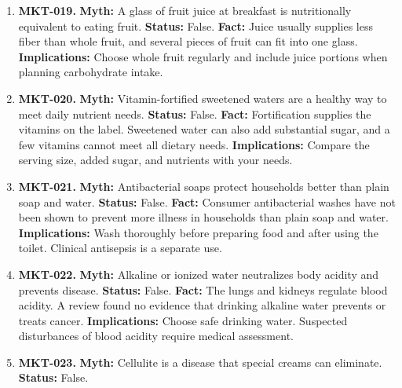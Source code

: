 \documentclass[11pt,oneside]{book}
\begin{document}
\begin{enumerate}[leftmargin=0pt,labelwidth=0pt,labelsep=0pt,itemindent=0pt]
\item[] \textbf{MKT-019.} \textbf{Myth:} A glass of fruit juice at breakfast is nutritionally equivalent to eating fruit.\newline
\textbf{Status:} False.\newline
\textbf{Fact:} Juice usually supplies less fiber than whole fruit, and several pieces of fruit can fit into one glass. \cite{ref109}\newline
\textbf{Implications:} Choose whole fruit regularly and include juice portions when planning carbohydrate intake.
\item[] \textbf{MKT-020.} \textbf{Myth:} Vitamin-fortified sweetened waters are a healthy way to meet daily nutrient needs.\newline
\textbf{Status:} False.\newline
\textbf{Fact:} Fortification supplies the vitamins on the label. Sweetened water can also add substantial sugar, and a few vitamins cannot meet all dietary needs. \cite{ref106,ref20,ref375}\newline
\textbf{Implications:} Compare the serving size, added sugar, and nutrients with your needs.
\item[] \textbf{MKT-021.} \textbf{Myth:} Antibacterial soaps protect households better than plain soap and water.\newline
\textbf{Status:} False.\newline
\textbf{Fact:} Consumer antibacterial washes have not been shown to prevent more illness in households than plain soap and water. \cite{ref394}\newline
\textbf{Implications:} Wash thoroughly before preparing food and after using the toilet. Clinical antisepsis is a separate use.
\item[] \textbf{MKT-022.} \textbf{Myth:} Alkaline or ionized water neutralizes body acidity and prevents disease.\newline
\textbf{Status:} False.\newline
\textbf{Fact:} The lungs and kidneys regulate blood acidity. A review found no evidence that drinking alkaline water prevents or treats cancer. \cite{ref111}\newline
\textbf{Implications:} Choose safe drinking water. Suspected disturbances of blood acidity require medical assessment.
\item[] \textbf{MKT-023.} \textbf{Myth:} Cellulite is a disease that special creams can eliminate.\newline
\textbf{Status:} False.\newline

\end{enumerate}
\end{document}
